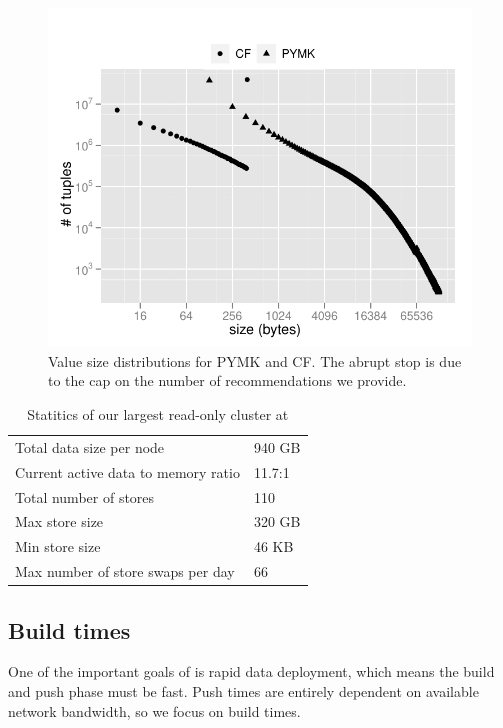 \begin{figure}
  \centering
    \includegraphics[scale=0.55]{images/data_distribution.pdf}
  \caption{Value size distributions for PYMK and CF. The abrupt stop
is due to the cap on the number of recommendations we provide.}
  \label{distribution}
\end{figure}

\begin{table}
\begin{center}
	\begin{tabular} { | l | l | }
	\hline
	Total data size per node &	940 GB			\\ 
	Current active data to memory ratio &	11.7:1		\\
	\hline
	Total number of stores &	110 	\\
	Max store size  &		320 GB	\\
	Min store size &		46 KB	\\
	Max number of store swaps per day & 66	\\
	\hline
	\end{tabular}
\end{center}
	\caption{Statitics of our largest read-only cluster at \linkedin{}}
 	\label{tab:production_statistics}
\end{table}

\subsection{Build times}

One of the important goals of \projectname{} is rapid data deployment,
which means the build and push phase must be fast. Push times are
entirely dependent on available network bandwidth, so we focus on
build times.
 
